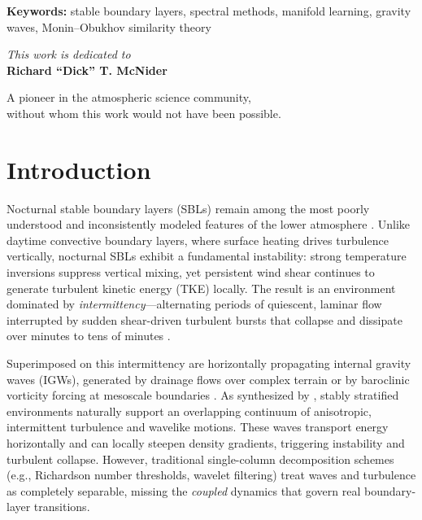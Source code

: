 \documentclass[11pt,a4paper]{article}
\begin{document}
\noindent \textbf{Keywords:} stable boundary layers, spectral methods, manifold learning, gravity waves, Monin--Obukhov similarity theory

\thispagestyle{empty}
\vspace*{\fill}
\begin{center}
  {\large \textit{This work is dedicated to}}\\
  \vspace{0.8em}
  {\LARGE \textbf{Richard ``Dick'' T. McNider}}\\
  \vspace{1.2em}
  \begin{minipage}{0.82\textwidth}
  \centering
  \normalsize
  A pioneer in the atmospheric science community,\\
  without whom this work would not have been possible.
  \end{minipage}
\end{center}
\vspace*{\fill}

\newpage
\tableofcontents
\newpage

\section{Introduction}
\label{sec:intro}

Nocturnal stable boundary layers (SBLs) remain among the most poorly understood and inconsistently modeled features of the lower atmosphere \citep{Mahrt2014, Acevedo2016}. Unlike daytime convective boundary layers, where surface heating drives turbulence vertically, nocturnal SBLs exhibit a fundamental instability: strong temperature inversions suppress vertical mixing, yet persistent wind shear continues to generate turbulent kinetic energy (TKE) locally. The result is an environment dominated by \emph{intermittency}---alternating periods of quiescent, laminar flow interrupted by sudden shear-driven turbulent bursts that collapse and dissipate over minutes to tens of minutes \citep{Mahrt1999, Terradellas2001}.

Superimposed on this intermittency are horizontally propagating internal gravity waves (IGWs), generated by drainage flows over complex terrain or by baroclinic vorticity forcing at mesoscale boundaries \citep{Vosper2006, Sun2015}. As synthesized by \citet{Sun2015}, stably stratified environments naturally support an overlapping continuum of anisotropic, intermittent turbulence and wavelike motions. These waves transport energy horizontally and can locally steepen density gradients, triggering instability and turbulent collapse. However, traditional single-column decomposition schemes (e.g., Richardson number thresholds, wavelet filtering) treat waves and turbulence as completely separable, missing the \emph{coupled} dynamics that govern real boundary-layer transitions.
\end{document}
